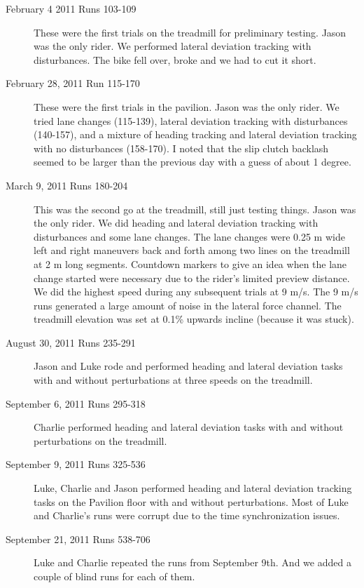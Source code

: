 \documentclass{article}
\begin{document}
\begin{description}
  \item[February 4 2011 Runs 103-109] These were the first trials on the
    treadmill for preliminary testing. Jason was the only rider. We performed
    lateral deviation tracking with disturbances. The bike fell over, broke and
    we had to cut it short.
  \item[February 28, 2011 Run 115-170] These were the first trials in the
    pavilion. Jason was the only rider. We tried lane changes (115-139),
    lateral deviation tracking with disturbances (140-157), and a mixture of
    heading tracking and lateral deviation tracking with no disturbances
    (158-170). I noted that the slip clutch backlash seemed to be larger than
    the previous day with a guess of about 1 degree.
  \item[March 9, 2011 Runs 180-204] This was the second go at the treadmill,
    still just testing things. Jason was the only rider. We did heading and
    lateral deviation tracking with disturbances and some lane changes. The
    lane changes were 0.25 m wide left and right maneuvers back and forth among
    two lines on the treadmill at 2 m long segments. Countdown markers to give
    an idea when the lane change started were necessary due to the rider's
    limited preview distance. We did the highest speed during any subsequent
    trials at 9 m/s. The 9 m/s runs generated a large amount of noise in the
    lateral force channel. The treadmill elevation was set at 0.1\% upwards
    incline (because it was stuck).
  \item[August 30, 2011 Runs 235-291] Jason and Luke rode and performed heading
    and lateral deviation tasks with and without perturbations at three speeds
    on the treadmill.
  \item[September 6, 2011 Runs 295-318] Charlie performed heading and lateral
    deviation tasks with and without perturbations on the treadmill.
  \item[September 9, 2011 Runs 325-536] Luke, Charlie and Jason performed
    heading and lateral deviation tracking tasks on the Pavilion floor with and
    without perturbations. Most of Luke and Charlie's runs were corrupt due to
    the time synchronization issues.
  \item[September 21, 2011 Runs 538-706] Luke and Charlie repeated the runs
    from September 9th. And we added a couple of blind runs for each of them.
\end{description}
\end{document}
